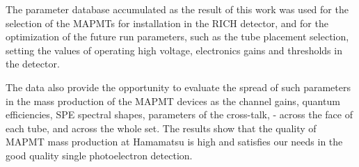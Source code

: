 The parameter database accumulated as the result of this work was used for the selection of the MAPMTs for installation in the RICH detector, and for the optimization of the future run parameters, such as the tube placement selection, setting the values of operating high voltage, electronics gains and thresholds in the detector.


The data also provide the opportunity to evaluate the spread of such parameters in the mass production of the MAPMT devices as the channel gains, quantum efficiencies, SPE spectral shapes, parameters of the cross-talk, - across the face of each tube, and across the whole set. The results show that the quality of MAPMT mass production at Hamamatsu is high and satisfies our needs in the good quality single photoelectron detection.




